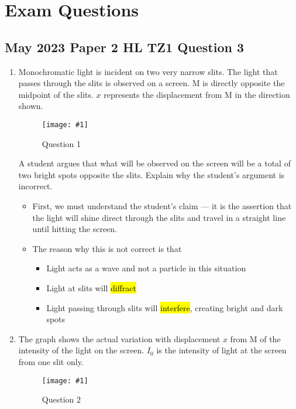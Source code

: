 \documentclass[a4paper,12pt]{article}
\let\oldsection\section
\renewcommand\section{\clearpage\oldsection}
\newcommand{\img}[4]{\begin{center}
  \begin{figure}[H]
    \centering
    \texttt{[image: \#1]}
    \caption{#3}
    \label{fig:#4}
  \end{figure}
\end{center}}
\begin{document}
\section{Exam Questions}

\subsection{May 2023 Paper 2 HL TZ1 Question 3}

\begin{enumerate}[label=(\alph*)]
  \item Monochromatic light is incident on two very narrow slits. The light that passes through
        the slits is observed on a screen. M is directly opposite the midpoint of the slits.
        $x$ represents the displacement from M in the direction shown.
        \img{ex/1.png}{0.5}{Question 1}{ex1}
        A student argues that what will be observed on the screen will be a total of two bright
        spots opposite the slits. Explain why the student's argument is incorrect.
        \begin{itemize}
          \item First, we must understand the student's claim --- it is the assertion that the light will shine direct through the slits and travel in a straight line until hitting the screen.
          \item The reason why this is not correct is that
                \begin{itemize}
                  \item Light acts as a wave and not a particle in this situation
                  \item Light at slits will \hl{diffract}
                  \item Light passing through slits will \hl{interfere}, creating bright and dark spots
                \end{itemize}
        \end{itemize}
        \pagebreak
  \item The graph shows the actual variation with displacement $x$ from M of the intensity of the light on the screen. $I_0$ is the intensity of light at the screen from one slit only.
        \img{ex/2.png}{0.5}{Question 2}{ex2}


\end{enumerate}
\end{document}
